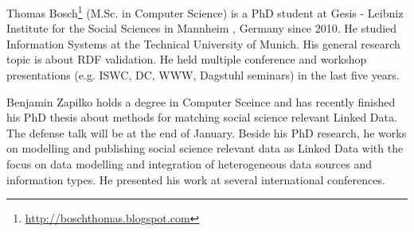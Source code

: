 \documentclass{llncs}
\begin{document}

Thomas Bosch\footnote{\url{http://boschthomas.blogspot.com}} (M.Sc. in Computer Science) is a PhD student at Gesis - Leibniz Institute for the Social Sciences in Mannheim , Germany since 2010.
He studied Information Systems at the Technical University of Munich.
His general research topic is about RDF validation. 
He held multiple conference and workshop presentations (e.g. ISWC, DC, WWW, Dagstuhl seminars) in the last five years. 

Benjamin Zapilko holds a degree in Computer Sceince and has recently finished his PhD thesis about methods for matching social science relevant Linked Data. The defense talk will be at the end of January. Beside his PhD research, he works on modelling and publishing social science relevant data as Linked Data with the focus on data modelling and integration of heterogeneous data sources and information types. He presented his work at several international conferences.

{}

\setcounter{tocdepth}{1}
\end{document}

